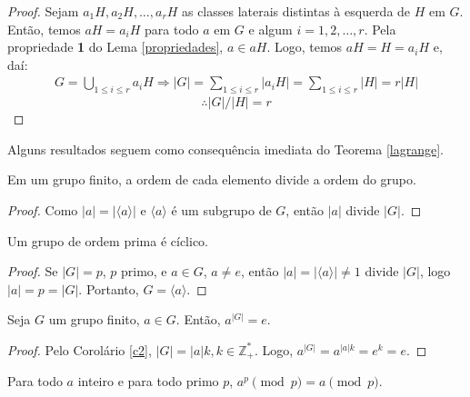 	\begin{proof}
		Sejam $a_1H, a_2H, \dots , a_rH$ as classes laterais distintas à esquerda de $H$ em $G$. Então, temos $aH = a_iH$ para todo $a$ em $G$ e algum $i = 1,2,\dots,r$. Pela propriedade \textbf{1} do Lema \eqref{propriedades}, $a\in aH$. Logo, temos $aH = H = a_iH$ e, daí:
		\begin{align*}
		G = \bigcup_{1\leq i\leq r}^{}a_iH \Rightarrow |G| = \sum_{1\leq i\leq r}^{}|a_iH| = \sum_{1\leq i\leq r}^{}|H| = r|H|
		\end{align*} 
		\begin{equation*}
		\therefore |G|/|H| = r
		\end{equation*}
		
	\end{proof}
	\par\vspace{0.3cm} Alguns resultados seguem como consequência imediata do Teorema \eqref{lagrange}.
	
	\begin{corollary}
		\label{c2}
		Em um grupo finito, a ordem de cada elemento divide a ordem do grupo.
	\end{corollary}
	
	\begin{proof}
		Como $|a| = |\langle a\rangle|$ e $\langle a \rangle$ é um subgrupo de $G$, então $|a|$ divide $|G|$. 
	\end{proof}
	
	\begin{corollary}
		\label{c3}
		Um grupo de ordem prima é cíclico.
	\end{corollary}
	
	\begin{proof}
		Se $|G| = p$, $p$ primo, e $a\in G$, $a\neq e$, então $|a| = |\langle a\rangle | \neq 1$ divide $|G|$, logo $|a| = p = |G|$. Portanto, $G = \langle a\rangle$. 
	\end{proof}
	
	\begin{corollary}
		\label{c4}
		Seja $G$ um grupo finito, $a\in G$. Então, $a^{|G|} = e.$
	\end{corollary}
	
	\begin{proof}
		Pelo Corolário \eqref{c2}, $|G| = |a| k, k\in\mathbb{Z}_{+}^{*}$. Logo, $a^{|G|} = a^{|a|k} = e^k = e$. 
	\end{proof}
	
	\begin{corollary}
		\label{c5}
		Para todo $a$ inteiro e para todo primo $p$, $a^p \pmod p = a\pmod p$.
	\end{corollary}
	
